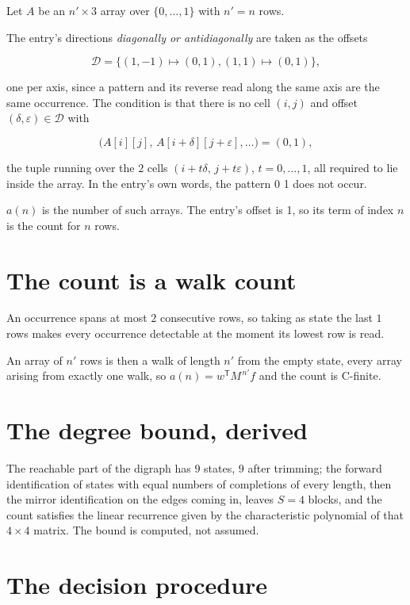 \documentclass[11pt]{article}
\theoremstyle{definition}
\begin{document}
Let $A$ be an $n' \times 3$ array over $\{0,\dots,1\}$ with $n' = n$ rows.

The entry's directions {\itshape diagonally or antidiagonally} are taken as the offsets

\[\mathcal{D} = \{(1,-1)\mapsto(0,1), (1,1)\mapsto(0,1)\},\]

one per axis, since a pattern and its reverse read along the same axis are the same occurrence. The condition is that there is no cell $(i,j)$ and offset $(\delta,\varepsilon)\in\mathcal{D}$ with

\[\bigl(A[i][j],\,A[i{+}\delta][j{+}\varepsilon],\dots\bigr) = (0, 1),\]

the tuple running over the $2$ cells $(i+t\delta,\,j+t\varepsilon)$, $t = 0,\dots,1$, all required to lie inside the array. In the entry's own words, the pattern 0 1 does not occur.

$a(n)$ is the number of such arrays. The entry's offset is 1, so its term of index $n$ is the count for $n$ rows.

\section{The count is a walk count}

An occurrence spans at most $2$ consecutive rows, so taking as state the last $1$ rows makes every occurrence detectable at the moment its lowest row is read.

An array of $n'$ rows is then a walk of length $n'$ from the empty state, every array arising from exactly one walk, so $a(n) = w^{\mathsf T}M^{\,n'}f$ and the count is C-finite.

\section{The degree bound, derived}

The reachable part of the digraph has $9$ states, $9$ after trimming; the forward identification of states with equal numbers of completions of every length, then the mirror identification on the edges coming in, leaves $S = 4$ blocks, and the count satisfies the linear recurrence given by the characteristic polynomial of that $4\times4$ matrix. The bound is computed, not assumed.

\section{The decision procedure}
\end{document}
